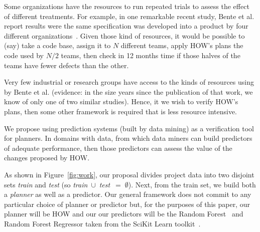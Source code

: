 \documentclass[conference]{IEEEtran}
\newcommand{\fig}[1]{Figure~\ref{fig:#1}}
\begin{document}
Some organizations have the resources to 
run repeated trials to assess the effect of different treatments.
For example, in one remarkable recent study, Bente et al. report results
were the same specification was developed into a product by four different organizations~\cite{Anda2009}. Given those kind of resources, it would be possible
to (say) take a code base, assign it to $N$ different teams, apply
HOW's plans the code used by  $N/2$ teams, then check in 12 months time
if those halves of the teams have fewer defects than the other.  

Very few industrial or research groups have access
to the kinds of resources using by Bente et al. (evidence: in the size years since the
publication of that work, we know of only one of two similar studies). Hence, it
we wish to verify HOW's plans, then some other framework is required that is less
resource intensive.
 




We propose using prediction systems (built by data mining) as a verification
tool for planners. In domains with data, from which data miners can build
predictors of adequate performance, then those predictors can assess the value
of the changes proposed by HOW.

As shown in \fig{work}, our proposal divides
project data  into two disjoint sets {\em train} and {\em test}
(so \mbox{{\em train} $\cup$ {\em test} $=\;\emptyset$}).
Next, from the train set, we build both a {\em planner} as well
as a {  predictor}. Our general framework does not   commit to any particular  choice
of { planner} or { predictor} but, for the purposes of this paper, 
our { planner}
will be HOW  and our
our { predictors} will be the Random Forest~\cite{Breiman2001} and Random Forest
Regressor taken from the SciKit
Learn toolkit~\cite{Pedregosa2012}.  
%
%
\end{document}
